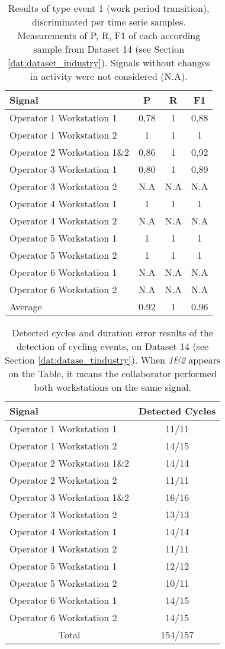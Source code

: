 \begin{table}
\caption{Results of type event 1 (work period transition), discriminated per time serie samples. Measurements of \gls{P}, \gls{R}, \gls{F1} of each according sample from Dataset 14 (see Section \ref{dat:dataset_industry}). Signals without changes in activity were not considered (N.A).}
\label{tab:auto_scores}
\centering
\begin{tabular}{lccc}
\toprule
Signal         & \gls{P}    & \gls{R} & \gls{F1}\\
\midrule
Operator 1 Workstation 1      & 0,78 & 1 & 0,88\\
Operator 1 Workstation 2      & 1    & 1 & 1\\
Operator 2 Workstation 1\&2 & 0,86 & 1 & 0,92\\
Operator 3 Workstation 1    & 0,80 & 1 & 0,89\\
Operator 3 Workstation 2 & N.A & N.A & N.A\\
Operator 4 Workstation 1    & 1    & 1 & 1\\
Operator 4 Workstation 2 & N.A & N.A & N.A\\
Operator 5 Workstation 1      & 1    & 1 & 1\\
Operator 5 Workstation 2      & 1    & 1 & 1\\
Operator 6 Workstation 1 & N.A & N.A & N.A\\
Operator 6 Workstation 2 & N.A & N.A & N.A\\ 
\hline
Average & 0.92 & 1 & 0.96\\
\bottomrule
\end{tabular}
\end{table}

\begin{table}
\centering
\caption{Detected cycles and duration error results of the detection of cycling events, on Dataset 14 (see Section \ref{dat:datase_tindustry}). When \textit{1\&2} appears on the Table, it means the collaborator performed both workstations on the same signal.}
\label{tab:wc_results}
\begin{tabular}{lc} 
\toprule
Signal & Detected Cycles\\ 
\midrule
Operator 1 Workstation 1 & 11/11\\
Operator 1 Workstation 2 & 14/15\\
Operator 2 Workstation 1\&2 & 14/14\\
Operator 2 Workstation 2 & 11/11\\
Operator 3 Workstation 1\&2 & 16/16\\
Operator 3 Workstation 2 & 13/13\\
Operator 4 Workstation 1 & 14/14\\
Operator 4 Workstation 2 & 11/11\\
Operator 5 Workstation 1 & 12/12\\
Operator 5 Workstation 2 & 10/11\\
Operator 6 Workstation 1 & 14/15\\
Operator 6 Workstation 2 & 14/15\\ 
\midrule
\multicolumn{1}{c}{Total} & 154/157\\
\bottomrule
\end{tabular}
\end{table}


